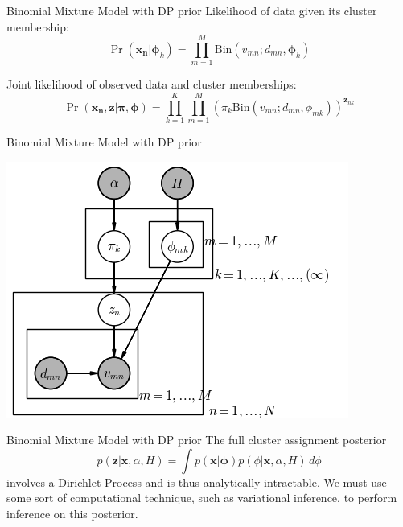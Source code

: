 \documentclass{beamer}
\newcommand{\bx}{\ensuremath{\mathbf{x}}}
\newcommand{\bz}{\ensuremath{\mathbf{z}}}
\newcommand{\bphi}{\ensuremath{\bm{\phi}}}
\begin{document}
\begin{frame}{Binomial Mixture Model with DP prior}
Likelihood of data given its cluster membership:
\begin{equation*} \label{eq:xlikelihood}
\Pr(\mathbf{x_n} | \bphi_k) = \prod\limits_{m=1}^M \mathrm{Bin}(v_{mn}; d_{mn}, \bphi_k)
\end{equation*}

\pause
Joint likelihood of observed data and cluster memberships:
\begin{equation*}
\Pr(\mathbf{x_n}, \bz | \bm{\pi}, \bphi) = \prod\limits_{k=1}^K \prod\limits_{m=1}^M \left(\pi_k \mathrm{Bin}(v_{mn}; d_{mn}, \phi_{mk})\right)^{\bz_{nk}}
\end{equation*}
\end{frame}

\begin{frame}{Binomial Mixture Model with DP prior}
\centerline{\includegraphics[scale=0.70]{images/multi_pgm.png}}
\end{frame}

\begin{frame}{Binomial Mixture Model with DP prior}
The full cluster assignment posterior 
\begin{equation*}
p(\bz | \bx, \alpha, H) = \int p(\bx | \mathbf{\phi}) p(\phi | \bx, \alpha, H) \, d\phi
\end{equation*}
involves a Dirichlet Process and is thus analytically intractable. We must use some sort of computational technique, such as variational inference, to perform inference on this posterior.
\end{frame}
\end{document}

